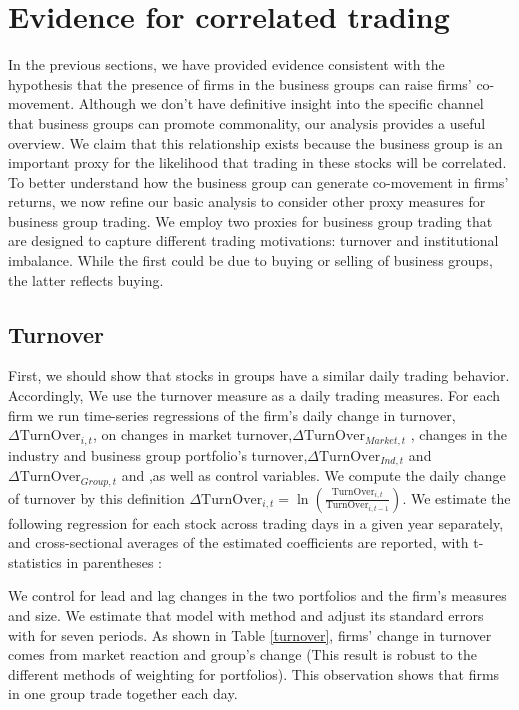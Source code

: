 \section{{Evidence for correlated trading} }


	In the previous sections, we have provided evidence consistent with the hypothesis that the presence of firms in the business groups can raise firms' co-movement. Although we don't have definitive insight into the specific channel that business groups can promote commonality, our analysis provides a useful overview.
	We claim that this relationship exists because the business group is an important proxy for the likelihood that trading in these stocks will be correlated. To better understand how the business group can generate co-movement in firms' returns, we now refine our basic analysis to consider other proxy measures for business group trading.
	We employ two proxies for business group trading that are designed to capture different trading motivations: turnover and institutional imbalance. While the first could be due to buying or selling of business groups, the latter reflects buying.



\subsection{{Turnover}}


	First, we should show that stocks in groups have a similar daily trading behavior. Accordingly, We use the turnover measure as a daily trading measures. For each firm we run time-series regressions of the firm's daily change in turnover, $ \Delta \text{TurnOver}_{i,t} $, on changes in market turnover,$ \Delta\text{TurnOver}_{Market,t}   $ , changes in the industry and business group portfolio's turnover,$ \Delta\text{TurnOver}_{Ind,t} $ and  $\Delta \text{TurnOver}_{Group,t} $ and  ,as well as control variables.
	We compute the daily change of turnover by this definition $ \Delta \text{TurnOver}_{i,t} = \ln(\frac{\text{TurnOver}_{i,t}}{\text{TurnOver}_{i,t-1}}) $. 
	We estimate the following regression for each stock across trading days in a given year separately, and cross-sectional averages of the estimated coefficients are reported, with t-statistics in parentheses :
	
		
	  We control for lead and lag changes in the two portfolios and the firm's measures and size. We estimate that model with \cite{FamaMacBeth} method and adjust its standard errors with \cite{newey1987hypothesis} for seven periods.  As shown in Table \ref{turnover}, firms' change in turnover comes from market reaction and group's change (This result is robust to the different methods of weighting for portfolios). This observation shows that firms in one group trade together each day. 
	
